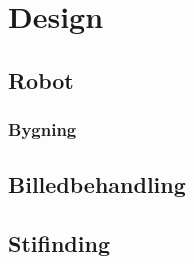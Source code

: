 \chapter{Design}

\section{Robot}
\subsection{Bygning}

\section{Billedbehandling}
\section{Stifinding}